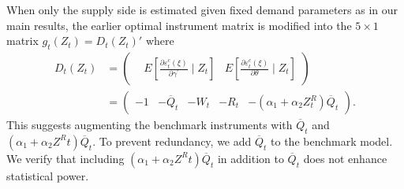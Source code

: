 \documentclass[11pt, a4paper]{article}
\begin{document}
When only the supply side is estimated given fixed demand parameters as in our main results, the earlier optimal instrument matrix is modified into the $5\times 1$ matrix $g_{t}(Z_{t})=D_{t}(Z_{t})'$ where 
\begin{align*}
    D_{t}(Z_{t}) &= \begin{pmatrix}
     & 
    E\left[\frac{\partial \varepsilon_{t}^{c}(\xi)}{\partial \gamma^{\prime}} \mid Z_{t}\right] & 
    E\left[\frac{\partial \varepsilon_{t}^{c}(\xi)}{\partial \theta} \mid Z_{t}\right]
    \end{pmatrix} \\
    &=\begin{pmatrix}
    -1 &
    -\overline{Q}_{t} &
    -W_{t} &
    -R_{t} &
    -(\alpha_1 + \alpha_2 Z^{R}_{t})\overline{Q}_{t}
    \end{pmatrix}.
\end{align*}
This suggests augmenting the benchmark instruments with $\overline{Q}_{t}$ and $(\alpha_1 + \alpha_2 Z^{R}{t})\overline{Q}_{t}$.
To prevent redundancy, we add $\overline{Q}_{t}$ to the benchmark model.
We verify that including $(\alpha_1 + \alpha_2 Z^{R}{t})\overline{Q}_{t}$ in addition to $\overline{Q}_{t}$ does not enhance statistical power.
\end{document}
